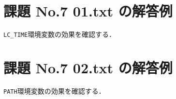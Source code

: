 \documentclass[a4j,twcolumn,11pt,nomag]{ltjarticle}      %
\begin{document}
\onecolumn

\section*{課題 No.7 01.txt の解答例}
\texttt{LC\_TIME}環境変数の効果を確認する．

\section*{課題 No.7 02.txt の解答例}
\texttt{PATH}環境変数の効果を確認する．
\end{document}
